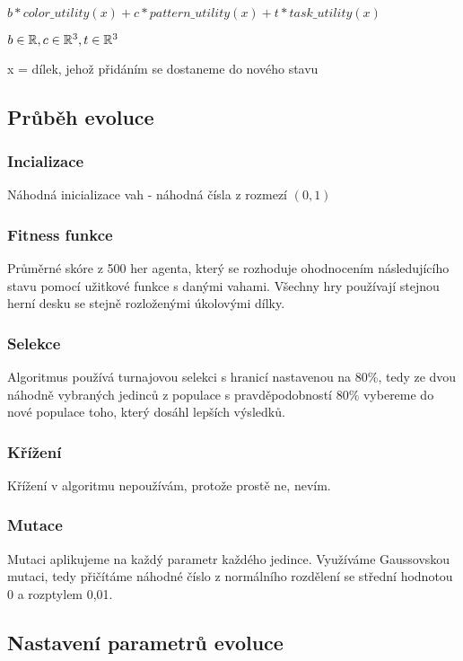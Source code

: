 $b*color\_utility(x) + c*pattern\_utility(x) + t*task\_utility(x)$ 

$b \in \Bbb{R}, c \in \Bbb{R}^3, t \in \Bbb{R}^3$

x = dílek, jehož přidáním se dostaneme do nového stavu

\subsection{Průběh evoluce}

\subsubsection*{Incializace}
Náhodná inicializace vah - náhodná čísla z rozmezí $(0,1)$
\subsubsection*{Fitness funkce}
Průměrné skóre z 500 her agenta, který se rozhoduje ohodnocením následujícího stavu pomocí užitkové funkce s danými vahami. Všechny hry používají stejnou herní desku se stejně rozloženými úkolovými dílky.
\subsubsection*{Selekce}
Algoritmus používá turnajovou selekci s hranicí nastavenou na 80\%, tedy ze dvou náhodně vybraných jedinců z populace s pravděpodobností 80\% vybereme do nové populace toho, který dosáhl lepších výsledků.
\subsubsection*{Křížení}
Křížení v algoritmu nepoužívám, protože prostě ne, nevím.
\subsubsection*{Mutace}
Mutaci aplikujeme na každý parametr každého jedince. Využíváme Gaussovskou mutaci, tedy přičítáme náhodné číslo z normálního rozdělení se střední hodnotou 0 a rozptylem 0,01.

\subsection{Nastavení parametrů evoluce}



